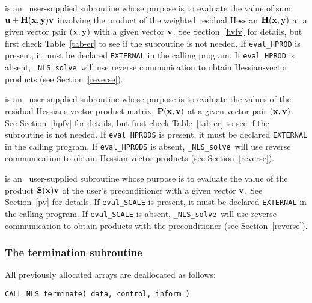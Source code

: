 \documentclass{galahad}
\newcommand{\packagename}{NLS}
\newcommand{\fullpackagename}{\libraryname\_\packagename}
\newcommand{\solver}{{\tt \fullpackagename\_solve}}
\begin{document}
\begin{description}
 is an \optional\
user-supplied subroutine whose purpose is to evaluate the value of sum
${\mathbf{u}} + {\mathbf{H}}({\mathbf{x}},{\mathbf{y}}) {\mathbf{v}}$ involving the product of the weighted residual
Hessian ${\mathbf{H}}({\mathbf{x}},{\mathbf{y}})$ at a given vector pair $({\mathbf{x}},{\mathbf{y}})$
with a given vector ${\mathbf{v}}$. See Section~\ref{hvfv} for details,
but first check Table~\ref{tab-er} to see if the subroutine is not needed.
If {\tt eval\_HPROD} is present,
it must be declared {\tt EXTERNAL} in the calling program.
If {\tt eval\_HPROD} is absent, \solver\ will use reverse communication to
obtain Hessian-vector products (see Section~\ref{reverse}).

 is an \optional\
user-supplied subroutine whose purpose is to evaluate the values of the
residual-Hessians-vector product matrix, ${\mathbf{P}}({\mathbf{x}},{\mathbf{v}})$
at a given vector pair $({\mathbf{x}},{\mathbf{v}})$.
See Section~\ref{hpfv} for details,
but first check Table~\ref{tab-er} to see if the subroutine is not needed.
If {\tt eval\_HPRODS} is present,
it must be declared {\tt EXTERNAL} in the calling program.
If {\tt eval\_HPRODS} is absent, \solver\ will use reverse communication to
obtain Hessian-vector products (see Section~\ref{reverse}).

 is an \optional\
user-supplied subroutine whose purpose is to evaluate the value of the
product ${\mathbf{S}}({\mathbf{x}}){\mathbf{v}}$ of the user's preconditioner with a given vector
${\mathbf{v}}$. See Section~\ref{pv} for details.
If {\tt eval\_SCALE} is present,
it must be declared {\tt EXTERNAL} in the calling program.
If {\tt eval\_SCALE} is absent, \solver\ will use reverse communication to
obtain products with the preconditioner (see Section~\ref{reverse}).

\end{description}


\subsubsection{The  termination subroutine}
All previously allocated arrays are deallocated as follows:
\vspace*{1mm}

\hspace{8mm}
{\tt CALL \packagename\_terminate( data, control, inform )}
\end{document}
